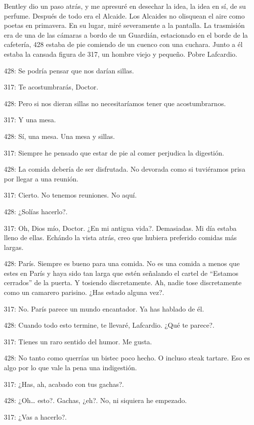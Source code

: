 Bentley dio un paso atrás, y me apresuré en desechar la idea, la idea en
sí, de su perfume. Después de todo era el Alcaide. Los Alcaides no
olisquean el aire como poetas en primavera. En su lugar, miré
severamente a la pantalla. La trasmisión era de una de las cámaras a
bordo de un Guardián, estacionado en el borde de la cafetería, 428
estaba de pie comiendo de un cuenco con una cuchara. Junto a él estaba
la cansada figura de 317, un hombre viejo y pequeño. Pobre Lafcardio.

428: Se podría pensar que nos darían sillas.

317: Te acostumbrarás, Doctor.

428: Pero si nos dieran sillas no necesitaríamos tener que
acostumbrarnos.

317: Y una mesa.

428: Sí, una mesa. Una mesa y sillas.

317: Siempre he pensado que estar de pie al comer perjudica la
digestión.

428: La comida debería de ser disfrutada. No devorada como si tuviéramos
prisa por llegar a una reunión.

317: Cierto. No tenemos reuniones. No aquí.

428: ¿Solías hacerlo?.

317: Oh, Dios mío, Doctor. ¿En mi antigua vida?. Demasiadas. Mi día
estaba lleno de ellas. Echándo la vista atrás, creo que hubiera
preferido comidas más largas.

428: París. Siempre es bueno para una comida. No es una comida a menos
que estes en París y haya sido tan larga que estén señalando el cartel
de ``Estamos cerrados'' de la puerta. Y tosiendo discretamente. Ah,
nadie tose discretamente como un camarero parisino. ¿Has estado alguna
vez?.

317: No. París parece un mundo encantador. Ya has hablado de él.

428: Cuando todo esto termine, te llevaré, Lafcardio. ¿Qué te parece?.

317: Tienes un raro sentido del humor. Me gusta.

428: No tanto como querrías un bistec poco hecho. O incluso steak
tartare. Eso es algo por lo que vale la pena una indigestión.

317: ¿Has, ah, acabado con tus gachas?.

428: ¿Oh\ldots{} esto?. Gachas, ¿eh?. No, ni siquiera he empezado.

317: ¿Vas a hacerlo?.

